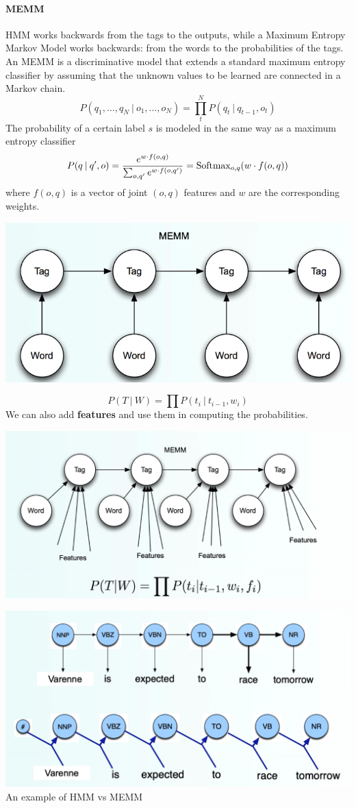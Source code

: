 \documentclass[10pt]{report}
\begin{document}
\paragraph{MEMM} HMM works backwards from the tags to the outputs, while a Maximum Entropy Markov Model works backwards: from the words to the probabilities of the tags. An MEMM is a discriminative model that extends a standard maximum entropy classifier by assuming that the unknown values to be learned are connected in a Markov chain.
$$P(q_1,\ldots,q_N\:|\:o_1,\ldots,o_N)=\prod_t^N P(q_t\:|\:q_{t-1},o_t)$$
The probability of a certain label $s$ is modeled in the same way as a maximum entropy classifier $$P(q\:|\:q',o)=\frac{e^{w\cdot f(o,q)}}{\sum_{o,q'}e^{w\cdot f(o,q')}}=\hbox{Softmax}_{o,q}(w\cdot f(o,q))$$
where $f(o,q)$ is a vector of joint $(o,q)$ features and $w$ are the corresponding weights.
\begin{center}
	\includegraphics[scale=0.5]{16.png}
\end{center}
$$P(T\:|\:W) = \prod P(t_i\:|\:t_{i-1}, w_i)$$
We can also add \textbf{features} and use them in computing the probabilities.
\begin{center}
	\includegraphics[scale=0.33]{17.png}
\end{center}
\begin{center}
	\includegraphics[scale=0.33]{18.png}\\
	An example of HMM vs MEMM
\end{center}
\end{document}
